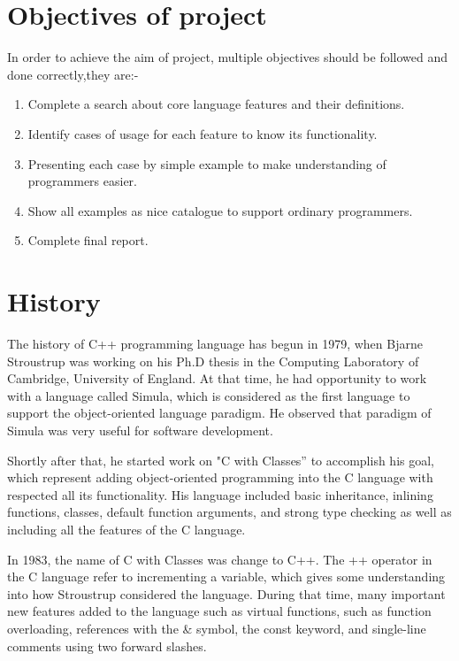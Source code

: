 \documentclass[11pt]{report}
\begin{document}
\section{Objectives of project}
\label{section:objectives of project}
In order to achieve the aim of project, multiple objectives should be followed and done correctly,they are:-
 \begin{enumerate}
   \item Complete a search about core language features and their definitions.
   \item Identify cases of usage for each feature  to know its functionality.
   \item Presenting each case by simple example to make understanding of \linebreak programmers easier.
   \item Show all examples as nice catalogue to support ordinary \linebreak programmers.
   \item Complete final report.
 \end{enumerate}       
 
  
\section{History}
\label{section: History}
The history of C++ programming language has begun in 1979, when Bjarne Stroustrup was working on his Ph.D thesis in the Computing Laboratory of Cambridge, University of England. At that time, he had opportunity to work with a language called Simula, which is considered as the first language to support the object-oriented language paradigm. He observed that paradigm of Simula was very useful for software development\cite{StroustrupHistory}.

Shortly after that, he started work on "C with Classes” to accomplish his goal, which represent adding object-oriented programming into the C language with respected all its functionality. His language included basic inheritance, inlining functions, classes, default function arguments, and strong type checking as well as including all the features of the C language\cite{StroustrupHistory}.

In 1983, the name of C with Classes was change to C++. The ++ operator in the C language refer to incrementing a variable, which gives some understanding into how Stroustrup considered the language. During that time, many important new features added to the language such as  virtual functions, such as function overloading, references with the \& symbol, the const keyword, and single-line comments using two forward slashes\cite{StroustrupHistory}.
\end{document}
